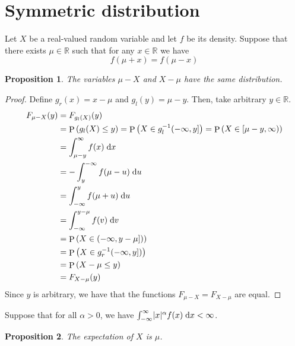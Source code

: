 \documentclass[11pt]{article}
\newtheorem{prop}{Proposition}
\theoremstyle{definition}
\theoremstyle{remark}
\newcommand{\question}{\section}
\newcommand{\parens}[1]{\left(#1\right)}
\DeclarePairedDelimiter{\abs}{\lvert}{\rvert}
\newcommand{\inv}{^{-1}}
\renewcommand{\d}{\mathrm{d}}
\newcommand{\intd}{\;\d}
\newcommand{\infinfint}{%
    \ensuremath \int_{-\infty}^{\infty}
}
\newcommand{\intfrominf}{%
    \ensuremath \int_{-\infty}
}
\newcommand{\inttoinf}{%
    \ensuremath \int^{\infty}
}
\newcommand{\R}{\mathbb{R}}
\DeclareMathOperator{\Prob}{P}
\renewcommand{\P}[1]{\Prob{\parens{#1}}}
\begin{document}
\question{Symmetric distribution}

Let $X$ be a real-valued random variable and let $f$ be its density.
Suppose that there exists $\mu \in \R$ such that for any $x \in \R$ we have
\begin{equation}
    \label{eq:mu}
    f(\mu + x) = f(\mu - x)
\end{equation}

\begin{prop}
    The variables $\mu - X$ and $X - \mu$ have the same distribution.
\end{prop}

\begin{proof}
    Define $g_r(x) = x - \mu$ and $g_l(y) = \mu - y$.
    Then, take arbitrary $y \in \R$.
    \begin{align*}
        F_{\mu - X}(y)
        &= F_{g_l(X)}(y) \\
        &= \P{g_l(X) \leq y}
            = \P{X \in g_l\inv(-\infty, y]}
            = \P{X \in [\mu - y, \infty)}
        \\
        &= \inttoinf_{\mu - y} f(x) \intd x \\
        &= - \int_y^{-\infty} f(\mu - u) \intd u \\
        &= \intfrominf^y f(\mu + u) \intd u \\
        &= \intfrominf^{y - \mu} f(v) \intd v \\
        &= \P{X \in (-\infty, y - \mu])} \\
        &= \P{X \in g_r\inv(-\infty, y])} \\
        &= \P{X - \mu \leq y} \\
        &= F_{X - \mu} (y)
    \end{align*}
    Since $y$ is arbitrary, we have that the functions
    $F_{\mu - X} = F_{X - \mu}$ are equal.
\end{proof}

Suppose that for all $\alpha > 0$,
we have $\infinfint \abs{x}^\alpha f(x) \intd x < \infty$.

\begin{prop}
    The expectation of $X$ is $\mu$.
\end{prop}
\end{document}
